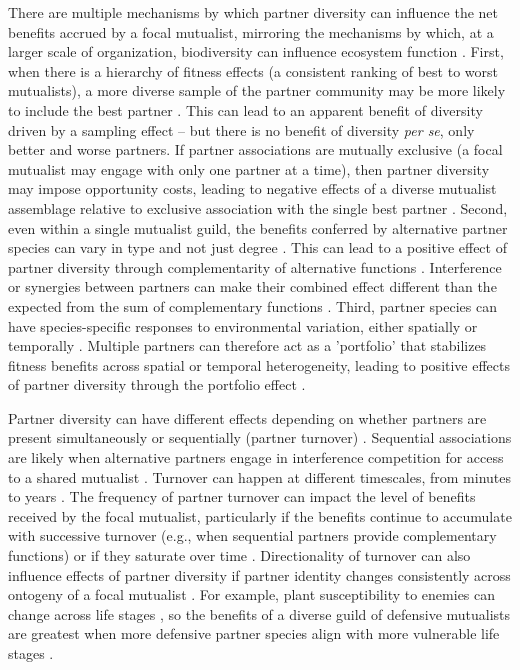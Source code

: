 \documentclass[11pt]{article}
\begin{document}
There are multiple mechanisms by which partner diversity can influence the net benefits accrued by a focal mutualist, mirroring the mechanisms by which, at a larger scale of organization, biodiversity can influence ecosystem function \cite{Yeung2006,Barrett2015,Ushio2020}. 
First, when there is a hierarchy of fitness effects (a consistent ranking of best to worst mutualists), a more diverse sample of the partner community may be more likely to include the best partner \cite{Frederickson2013}.
This can lead to an apparent benefit of diversity driven by a sampling effect \cite{Batstone2018} -- but there is no benefit of diversity \emph{per se}, only better and worse partners. 
If partner associations are mutually exclusive (a focal mutualist may engage with only one partner at a time), then partner diversity may impose opportunity costs, leading to negative effects of a diverse mutualist assemblage relative to exclusive association with the single best partner \citep{Miller2007}. 
Second, even within a single mutualist guild, the benefits conferred by alternative partner species can vary in type and not just degree \cite{Stachowicz2005,Bronstein2006,Stanton2003}. 
This can lead to a positive effect of partner diversity through complementarity of alternative functions \cite{Batstone2018}. 
Interference or synergies between partners can make their combined effect different than the expected from the sum of complementary functions \cite{Afkhami2014}. 
Third, partner species can have species-specific responses to environmental variation, either spatially \citep{Ollerton2006} or temporally \citep{Alarcon2008}. 
Multiple partners can therefore act as a 'portfolio' that stabilizes fitness benefits across spatial or temporal heterogeneity, leading to positive effects of partner diversity through the portfolio effect \cite{Batstone2018,Lazaro2022,Horvitz1990}. 

Partner diversity can have different effects depending on whether partners are present simultaneously or sequentially (partner turnover) \citep{Djieto-Lordon2005, Ness2006, Bruna2014,Barrett2015,Ushio2020,Dattilo2014}. 
Sequential associations are likely when alternative partners engage in interference competition for access to a shared mutualist \cite{Kiers2003,Batstone2018,Tgaard2015,Wulff2008}. 
Turnover can happen at different timescales, from minutes to years \citep{Oliveira1999,Horvitz1986}. 
The frequency of partner turnover can impact the level of benefits received by the focal mutualist, particularly if the benefits continue to accumulate with successive turnover (e.g., when sequential partners provide complementary functions) or if they saturate over time \citep{Sachs2004,Fiala1994}.
Directionality of turnover can also influence effects of partner diversity if partner identity changes consistently across ontogeny of a focal mutualist \citep{Fonseca2003,Noe1994,Dejean2008}.
For example, plant susceptibility to enemies can change across life stages \citep{Boege2005,Barton2010}, so the benefits of a diverse guild of defensive mutualists are greatest when more defensive partner species align with more vulnerable life stages \citep{Djieto-Lordon2005,Dejean2008}.
\end{document}
